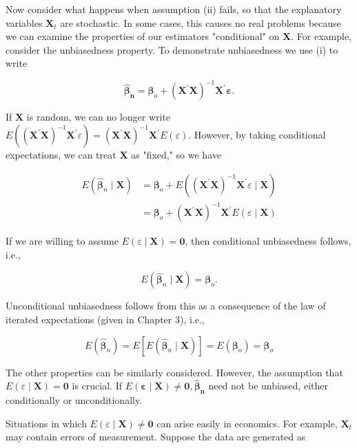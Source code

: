\documentclass[10pt]{article}
\begin{document}
Now consider what happens when assumption (ii) fails, so that the explanatory variables $\mathbf{X}_{t}$ are stochastic. In some cases, this causes no real problems because we can examine the properties of our estimators "conditional" on $\mathbf{X}$. For example, consider the unbiasedness property. To demonstrate unbiasedness we use (i) to write

$$
\hat{\boldsymbol{\beta}}_{\boldsymbol{n}}=\boldsymbol{\beta}_{o}+\left(\mathbf{X}^{\prime} \mathbf{X}\right)^{-1} \mathbf{X}^{\prime} \boldsymbol{\varepsilon} .
$$

If $\mathbf{X}$ is random, we can no longer write $E\left(\left(\mathbf{X}^{\prime} \mathbf{X}\right)^{-1} \mathbf{X}^{\prime} \varepsilon\right)=\left(\mathbf{X}^{\prime} \mathbf{X}\right)^{-1} \mathbf{X}^{\prime} E(\varepsilon)$. However, by taking conditional expectations, we can treat $\mathbf{X}$ as "fixed," so we have

$$
\begin{aligned}
E\left(\hat{\boldsymbol{\beta}}_{n} \mid \mathbf{X}\right) & =\boldsymbol{\beta}_{o}+E\left(\left(\mathbf{X}^{\prime} \mathbf{X}\right)^{-1} \mathbf{X}^{\prime} \varepsilon \mid \mathbf{X}\right) \\
& =\boldsymbol{\beta}_{o}+\left(\mathbf{X}^{\prime} \mathbf{X}\right)^{-1} \mathbf{X}^{\prime} E(\varepsilon \mid \mathbf{X})
\end{aligned}
$$

If we are willing to assume $E(\varepsilon \mid \mathbf{X})=\mathbf{0}$, then conditional unbiasedness follows, i.e.,

$$
E\left(\hat{\boldsymbol{\beta}}_{n} \mid \mathbf{X}\right)=\boldsymbol{\beta}_{o} .
$$

Unconditional unbiasedness follows from this as a consequence of the law of iterated expectations (given in Chapter 3), i.e.,

$$
E\left(\hat{\boldsymbol{\beta}}_{n}\right)=E\left[E\left(\hat{\boldsymbol{\beta}}_{n} \mid \mathbf{X}\right)\right]=E\left(\boldsymbol{\beta}_{o}\right)=\boldsymbol{\beta}_{o}
$$

The other properties can be similarly considered. However, the assumption that $E(\varepsilon \mid \mathbf{X})=\mathbf{0}$ is crucial. If $E(\boldsymbol{\varepsilon} \mid \mathbf{X}) \neq \mathbf{0}, \hat{\boldsymbol{\beta}}_{\boldsymbol{n}}$ need not be unbiased, either conditionally or unconditionally.

Situations in which $E(\varepsilon \mid \mathbf{X}) \neq \mathbf{0}$ can arise easily in economics. For example, $\mathbf{X}_{t}$ may contain errors of measurement. Suppose the data are generated as
\end{document}
